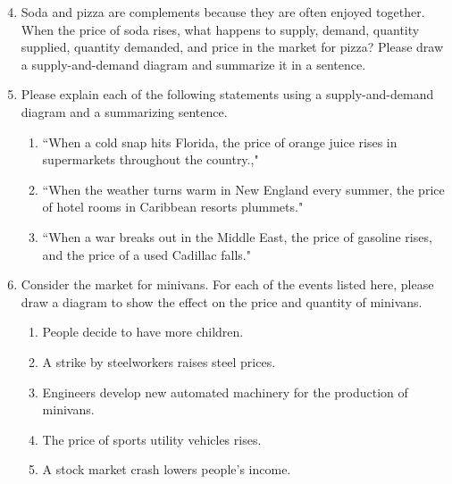 \documentclass{article}
\begin{document}
\begin{enumerate}
\setcounter{enumi}{3}

\item Soda and pizza are complements because they are often enjoyed together. When the price of soda rises, what happens to supply, demand, quantity supplied, quantity demanded, and price in the market for pizza? Please draw a supply-and-demand diagram and summarize it in a sentence.

\item Please explain each of the following statements using a supply-and-demand diagram and a summarizing sentence.

	\begin{enumerate}
	
	\item ``When a cold snap hits Florida, the price of orange juice rises in supermarkets throughout the country.,"
	
	\item ``When the weather turns warm in New England every summer, the price of hotel rooms in Caribbean resorts plummets."
	
	\item ``When a war breaks out in the Middle East, the price of gasoline rises, and the price of a used Cadillac falls."
	
	\end{enumerate}
	
\item Consider the market for minivans. For each of the events listed here, please draw a diagram to show the effect on the price and quantity of minivans.

	\begin{enumerate}
	
	\item People decide to have more children.
	
	\item A strike by steelworkers raises steel prices.
	
	\item Engineers develop new automated machinery for the production of minivans.
	
	\item The price of sports utility vehicles rises.
	
	\item A stock market crash lowers people's income.
	
	\end{enumerate}
	

\end{enumerate}
\end{document}
